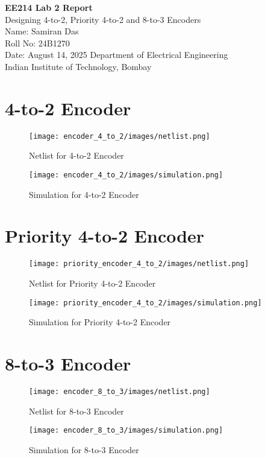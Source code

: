 \documentclass[a4paper,12pt]{report}
\begin{document}
\begin{titlepage}
    \centering
    {\Huge\bfseries EE214 Lab 2 Report\\[1.5em]}
    {\Large Designing 4-to-2, Priority 4-to-2 and 8-to-3 Encoders\\[2em]}
    \vfill
    {\large Name: Samiran Das\\
    Roll No: 24B1270\\
    Date: August 14, 2025}
    \vfill
    {\large Department of Electrical Engineering\\[1em]}
    {\large Indian Institute of Technology, Bombay\\[1em]}
\end{titlepage}




\section*{4-to-2 Encoder}
\begin{figure}[ht!]
    \centering
    \texttt{[image: encoder\_4\_to\_2/images/netlist.png]}
    \caption{Netlist for 4-to-2 Encoder}
\end{figure}
\begin{figure}[ht!]
    \centering
    \texttt{[image: encoder\_4\_to\_2/images/simulation.png]}
    \caption{Simulation for 4-to-2 Encoder}
\end{figure}
\clearpage
\clearpage

\section*{Priority 4-to-2 Encoder}
\begin{figure}[ht!]
    \centering
    \texttt{[image: priority\_encoder\_4\_to\_2/images/netlist.png]}
    \caption{Netlist for Priority 4-to-2 Encoder}
\end{figure}
\begin{figure}[ht!]
    \centering
    \texttt{[image: priority\_encoder\_4\_to\_2/images/simulation.png]}
    \caption{Simulation for Priority 4-to-2 Encoder}
\end{figure}
\clearpage
\clearpage

\section*{8-to-3 Encoder}
\begin{figure}[ht!]
    \centering
    \texttt{[image: encoder\_8\_to\_3/images/netlist.png]}
    \caption{Netlist for 8-to-3 Encoder}
\end{figure}
\begin{figure}[ht!]
    \centering
    \texttt{[image: encoder\_8\_to\_3/images/simulation.png]}
    \caption{Simulation for 8-to-3 Encoder}
\end{figure}
\clearpage
\clearpage
\end{document}
